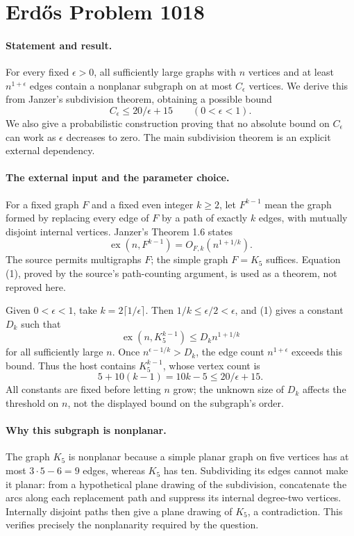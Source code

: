 \section*{Erd\H{o}s Problem 1018}

\paragraph{Statement and result.}
For every fixed \(\epsilon>0\), all sufficiently large graphs with \(n\) vertices and at least \(n^{1+\epsilon}\) edges contain a nonplanar subgraph on at most \(C_\epsilon\) vertices. We derive this from Janzer's subdivision theorem, obtaining a possible bound
\[
 C_\epsilon\leq 20/\epsilon+15\qquad(0<\epsilon<1).
\]
We also give a probabilistic construction proving that no absolute bound on \(C_\epsilon\) can work as \(\epsilon\) decreases to zero. The main subdivision theorem is an explicit external dependency.

\paragraph{The external input and the parameter choice.}
For a fixed graph \(F\) and a fixed even integer \(k\geq2\), let \(F^{k-1}\) mean the graph formed by replacing every edge of \(F\) by a path of exactly \(k\) edges, with mutually disjoint internal vertices. Janzer's Theorem 1.6 states
\[
 \operatorname{ex}(n,F^{k-1})=O_{F,k}(n^{1+1/k}).
\tag{1}
\]
The source permits multigraphs \(F\); the simple graph \(F=K_5\) suffices. Equation (1), proved by the source's path-counting argument, is used as a theorem, not reproved here.

Given \(0<\epsilon<1\), take \(k=2\lceil1/\epsilon\rceil\). Then \(1/k\leq\epsilon/2<\epsilon\), and (1) gives a constant \(D_k\) such that
\[
 \operatorname{ex}(n,K_5^{k-1})\leq D_k n^{1+1/k}
\]
for all sufficiently large \(n\). Once \(n^{\epsilon-1/k}>D_k\), the edge count \(n^{1+\epsilon}\) exceeds this bound. Thus the host contains \(K_5^{k-1}\), whose vertex count is
\[
 5+10(k-1)=10k-5\leq20/\epsilon+15.
\]
All constants are fixed before letting \(n\) grow; the unknown size of \(D_k\) affects the threshold on \(n\), not the displayed bound on the subgraph's order.

\paragraph{Why this subgraph is nonplanar.}
The graph \(K_5\) is nonplanar because a simple planar graph on five vertices has at most \(3\cdot5-6=9\) edges, whereas \(K_5\) has ten. Subdividing its edges cannot make it planar: from a hypothetical plane drawing of the subdivision, concatenate the arcs along each replacement path and suppress its internal degree-two vertices. Internally disjoint paths then give a plane drawing of \(K_5\), a contradiction. This verifies precisely the nonplanarity required by the question.

